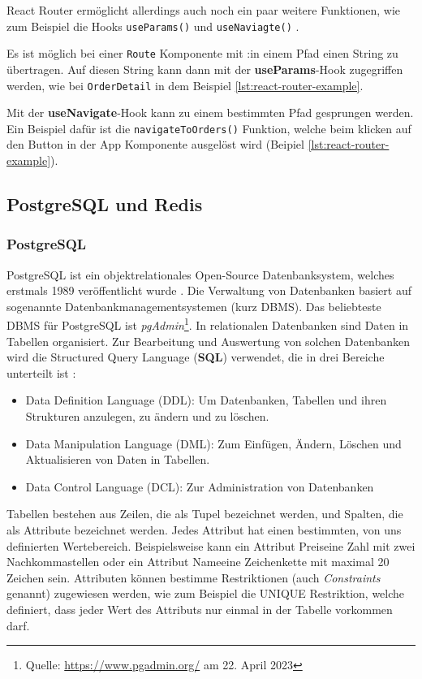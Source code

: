 React Router ermöglicht allerdings auch noch ein paar weitere Funktionen, wie zum Beispiel die Hooks \verb|useParams()| und \verb|useNaviagte()| \cite{react-key-concepts}. 

Es ist möglich bei einer \verb|Route| Komponente mit \glqq :\grqq{ }in einem Pfad einen String zu übertragen. Auf diesen String kann dann mit der \textbf{useParams}-Hook zugegriffen werden, wie bei \verb|OrderDetail| in dem Beispiel \ref{lst:react-router-example}. 

Mit der \textbf{useNavigate}-Hook kann zu einem bestimmten Pfad gesprungen werden. Ein Beispiel dafür ist die \verb|navigateToOrders()| Funktion, welche beim klicken auf den Button in der App Komponente ausgelöst wird (Beipiel \ref{lst:react-router-example}).

        \subsection{PostgreSQL und Redis}
        \subsubsection{PostgreSQL}
        \label{sec:PostgreSQL}
PostgreSQL ist ein objektrelationales Open-Source Datenbanksystem, welches erstmals 1989 veröffentlicht wurde \cite{postgresql-book}. Die Verwaltung von Datenbanken basiert auf sogenannte Datenbankmanagementsystemen (kurz DBMS). Das beliebteste DBMS für PostgreSQL ist \textit{pgAdmin}\footnote{Quelle: \url{https://www.pgadmin.org/} am 22. April 2023}.  In relationalen Datenbanken sind Daten in Tabellen organisiert. Zur Bearbeitung und Auswertung von solchen Datenbanken wird die Structured Query Language (\textbf{SQL}) verwendet, die in drei Bereiche unterteilt ist \cite{sql-book}:
\begin{itemize}
 \item Data Definition Language (DDL): Um Datenbanken, Tabellen und ihren Strukturen anzulegen, zu ändern und zu löschen.
 \item  Data Manipulation Language (DML): Zum Einfügen, Ändern, Löschen und Aktualisieren von Daten in Tabellen.
 \item Data Control Language (DCL): Zur Administration von Datenbanken
\end{itemize}

Tabellen bestehen aus Zeilen, die als Tupel bezeichnet werden, und Spalten, die als Attribute bezeichnet werden. Jedes Attribut hat einen bestimmten, von uns definierten Wertebereich. Beispielsweise kann ein Attribut \glqq Preis\grqq{ }eine Zahl mit zwei Nachkommastellen oder ein Attribut \glqq Name\grqq{ }eine Zeichenkette mit maximal 20 Zeichen sein.  Attributen können bestimme Restriktionen (auch \textit{Constraints} genannt) zugewiesen werden, wie zum Beispiel die UNIQUE Restriktion, welche definiert, dass jeder Wert des Attributs nur einmal in der Tabelle vorkommen darf.

